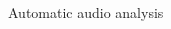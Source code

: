 \documentclass[final, hyperref, table]{beamer}
\begin{document}
\begin{frame}[containsverbatim]{}
\begin{columns}[T]
\begin{column}[T]{.5\linewidth}
\begin{block}{Automatic audio analysis}
\begin{center}
\begin{minipage}[h]{0.97\linewidth}
\begin{center}
      \end{center}
    \end{minipage}
  \end{center}
\end{block}
%     
 


\end{column}
\end{columns}
\end{frame}
\end{document}
